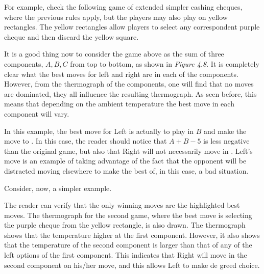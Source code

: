 For example, check the following game of extended simpler cashing cheques, where the previous rules apply, but the players may also play on yellow rectangles. The yellow rectangles allow players to select any correspondent purple cheque and then discard the yellow square.



It is a good thing now to consider the game above as the sum of three components, $A,B,C$ from top to bottom, as shown in \textit{Figure 4.8}. It is completely clear what the best moves for left and right are in each of the components. However, from the thermograph of the components, one will find that no moves are dominated, they all influence the resulting thermograph. As seen before, this means that depending on the ambient temperature the best move in each component will vary.

In this example, the best move for Left is actually to play in $B$ and make the move to . In this case, the reader should notice that $A + B - 5$ is less negative than the original game, but also that Right will not necessarily move in . Left's move is an example of taking advantage of the fact that the opponent will be distracted moving elsewhere to make the best of, in this case, a bad situation.

Consider, now, a simpler example.



The reader can verify that the only winning moves are the highlighted best moves. The thermograph for the second game, where the best move is selecting the purple cheque  from the yellow rectangle, is also drawn. The thermograph shows that the temperature higher at the first component. However, it also shows that the temperature of the second component is larger than that of any of the left options of the first component. This indicates that Right will move in the second component on his/her move, and this allows Left to make de greed choice.









